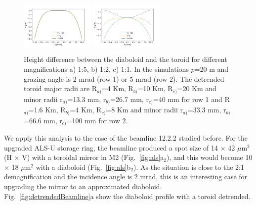 \documentclass{iucr}              %
\begin{document}
\begin{figure}
\includegraphics[width=0.32\textwidth]{figures/diaboloid_detrended_5mrad_1:2_profile.png}
\includegraphics[width=0.32\textwidth]{figures/diaboloid_detrended_5mrad_1:1_profile.png}

\caption{
Height difference between the diaboloid and the toroid for different magnifications a) 1:5, b) 1:2, c) 1:1. In the simulations $p$=20 m and grazing angle is 2 mrad (row 1) or 5 mrad (row 2). The detrended toroid major radii are R$_{a)}$=4 Km, R$_{b)}$=10 Km, R$_{c)}$=20 Km and minor radii r$_{a)}$=13.3 mm, r$_{b)}$=26.7 mm, r$_{c)}$=40 mm for row 1 and R$_{a)}$=1.6 Km, R$_{b)}$=4 Km, R$_{c)}$=8 Km and minor radii r$_{a)}$=33.3 mm, r$_{b)}$=66.6 mm, r$_{c)}$=100 mm for row 2.
}
\end{figure}


We apply this analysis to the case of the beamline 12.2.2 studied before. For the upgraded ALS-U storage ring, the beamline produced a spot size of 14 $\times$ 42 $\mu$m$^2$ (H $\times$ V) with a toroidal mirror in M2 (Fig.~\ref{fig:als}a$_2$), and this would become 10 $\times$ 18 $\mu$m$^2$ with a diaboloid (Fig.~\ref{fig:als}b$_2$). As the situation is close to the 2:1 demagnification and the incidence angle is 2 mrad, this is an interesting case for upgrading the mirror to an approximated diaboloid. Fig.~\ref{fig:detrendedBeamline}a show the diaboloid profile with a toroid detrended. 
\end{document}
